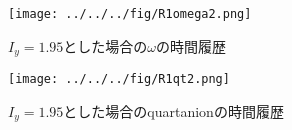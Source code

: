 \documentclass[class=article, crop=false, dvipdfmx, fleqn]{standalone}
\begin{document}
\begin{figure}[H]
  \begin{center}
  \texttt{[image: ../../../fig/R1omega2.png]}
  \caption{$I_y=1.95$とした場合の$\omega$の時間履歴}
\end{center}
\end{figure}

\begin{figure}[H]
  \begin{center}
  \texttt{[image: ../../../fig/R1qt2.png]}
  \caption{$I_y=1.95$とした場合のquartanionの時間履歴}
\end{center}
\end{figure}
\end{document}
